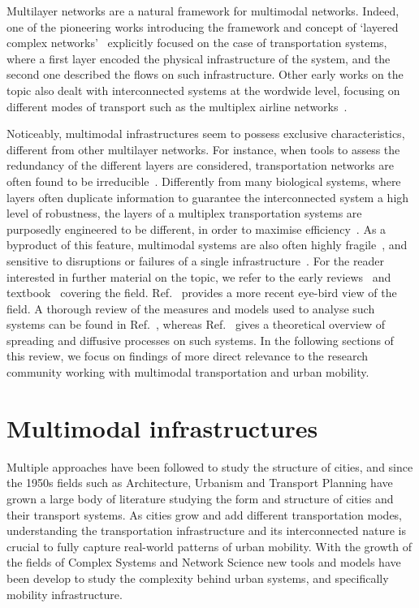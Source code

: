 Multilayer networks are a natural framework for multimodal networks. Indeed, one of the pioneering works introducing the framework and concept of `layered complex networks'~\cite{kurant2006layered} explicitly focused on the case of transportation systems, where a first layer encoded the physical infrastructure of the system, and the second one described the flows on such infrastructure. Other early works on the topic also dealt with interconnected systems at the wordwide level, focusing on different modes of transport such as the multiplex airline networks~\cite{cardillo2013emergence}.

Noticeably, multimodal infrastructures seem to possess exclusive characteristics, different from other multilayer networks. For instance, when tools to assess the redundancy of the different layers are considered, transportation networks are often found to be irreducible~\cite{dedomenico2015structural}. Differently from many biological systems, where layers often duplicate information to guarantee the interconnected system a high level of robustness, the layers of a multiplex transportation systems are purposedly engineered to be different, in order to maximise efficiency~\cite{latora2001efficient}. As a byproduct of this feature, multimodal systems are also often highly fragile~\cite{buldyrev2010catastrophic}, and sensitive to disruptions or failures of a single infrastructure~\cite{dedomenico2014interconnected}. For the reader interested in further material on the topic, we refer to the early reviews~\cite{boccaletti2014structure, kivela2014multilayer} and textbook~\cite{bianconi2018multilayer} covering the field. Ref.~\cite{aleta2019multilayer} provides a more recent eye-bird view of the field. A thorough review of the measures and models used to analyse such systems can be found in Ref.~\cite{battiston2017new}, whereas Ref.~\cite{dedomenico2016physics} gives a theoretical overview of spreading and diffusive processes on such systems. In the following sections of this review, we focus on findings of more direct relevance to the research community working with multimodal transportation and urban mobility. 


\section{Multimodal infrastructures}\label{sec:multimodalinfrastructures}

Multiple approaches have been followed to study the structure of cities, and since the 1950s fields such as Architecture, Urbanism and Transport Planning have grown a large body of literature studying the form and structure of cities and their transport systems. As cities grow and add different transportation modes, understanding the transportation infrastructure and its interconnected nature is crucial to fully capture real-world patterns of urban mobility. With the growth of the fields of Complex Systems and Network Science new tools and models have been develop to study the complexity behind urban systems, and specifically mobility infrastructure.


